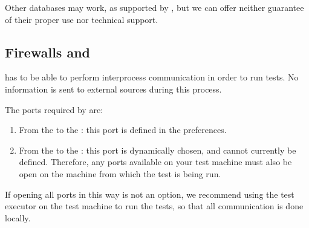 Other databases may work, as supported by , but we can offer neither guarantee of their proper use nor technical support. 

\subsection{Firewalls and \app{}}
\app{} has to be able to perform interprocess communication in order to run tests. No information is sent to external sources during this process. 

The ports required by \app{} are:
\begin{enumerate}
\item From the \ite{} to the \gdagent{}: this port is defined in the \app{}  preferences.
\item From the \gdaut{} to the \ite{}: this port is dynamically chosen, and cannot currently be defined. Therefore, any ports available on your test machine must also be open on the machine from which the test is being run.
\end{enumerate}

 If opening all ports in this way is not an option, we recommend using the \app{} test executor on the test machine to run the tests, so that all communication is done locally. 

